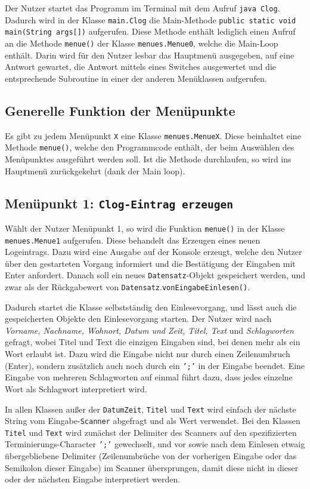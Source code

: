 \documentclass[oneside,12pt]{scrartcl}
\newcommand*{\EnableHyphenationInTexttt}{\hyphenchar\font=45\relax}%
\newcommand{\code}[1]{\textcolor{Firebrick4}{\bcode{#1}}}
\newcommand{\class}[1]{\textcolor{Green4}{\bcode{#1}}}
\newcommand{\method}[1]{\textcolor{Orange3}{\bcode{#1()}}}
\newcommand{\methodcall}[2]{\class{#1}.\method{#2}}
\newcommand{\bcode}[1]{\texttt{\EnableHyphenationInTexttt#1}}
\newcommand{\emphasize}[1]{\textsl{#1}}
\begin{document}
Der Nutzer startet das Programm im Terminal mit dem Aufruf \code{java Clog}. Dadurch wird in der Klasse \code{main.Clog} die Main-Methode \code{public static void main(String args[])} aufgerufen. Diese Methode enthält lediglich einen Aufruf an die Methode \code{menue()} der Klasse \code{menues.Menue0}, welche die Main-Loop enthält. Darin wird für den Nutzer lesbar das Hauptmenü ausgegeben, auf eine Antwort gewartet, die Antwort mittels eines Switches ausgewertet und die entsprechende Subroutine in einer der anderen Menüklassen aufgerufen. 

\subsection{Generelle Funktion der Menüpunkte}
Es gibt zu jedem Menüpunkt \code{X} eine Klasse \class{menues.MenueX}. Diese beinhaltet eine Methode \method{menue}, welche den Programmcode enthält, der beim Auswählen des Menüpunktes ausgeführt werden soll. Ist die Methode durchlaufen, so wird ins Hauptmenü zurückgekehrt (dank der Main loop).

\subsection{Menüpunkt 1: \code{Clog-Eintrag erzeugen}}
Wählt der Nutzer Menüpunkt 1, so wird die Funktion \code{menue()} in der Klasse \code{menues.Menue1} aufgerufen. Diese behandelt das Erzeugen eines neuen Logeintrags. Dazu wird eine Ausgabe auf der Konsole erzeugt, welche den Nutzer über den gestarteten Vorgang informiert und die Bestätigung der Eingaben mit Enter anfordert. Danach soll ein neues \class{Datensatz}-Objekt gespeichert werden, und zwar als der Rückgabewert von \methodcall{Datensatz}{vonEingabeEinlesen}.

Dadurch startet die Klasse selbstständig den Einlesevorgang, und lässt auch die gespeicherten Objekte den Einlesevorgang starten. Der Nutzer wird nach \emphasize{Vorname, Nachname, Wohnort, Datum und Zeit, Titel, Text} und \emphasize{Schlagworten} gefragt, wobei Titel und Text die einzigen Eingaben sind, bei denen mehr als ein Wort erlaubt ist. Dazu wird die Eingabe nicht nur durch einen Zeilenumbruch (Enter), sondern zusätzlich auch noch durch ein \code{';'} in der Eingabe beendet. Eine Eingabe von mehreren Schlagworten auf einmal führt dazu, dass jedes einzelne Wort als Schlagwort interpretiert wird.

In allen Klassen außer der \class{DatumZeit}, \class{Titel} und \class{Text} wird einfach der nächste String vom Eingabe-\code{Scanner} abgefragt und als Wert verwendet. Bei den Klassen \class{Titel} und \class{Text} wird zunächst der Delimiter des Scanners auf den spezifizierten Terminierungs-Character \code{';'} gewechselt, und vor sowie nach dem Einlesen etwaig übergebliebene Delimiter (Zeilenumbrüche von der vorherigen Eingabe oder das Semikolon dieser Eingabe) im Scanner übersprungen, damit diese nicht in dieser oder der nächsten Eingabe interpretiert werden.
\end{document}

